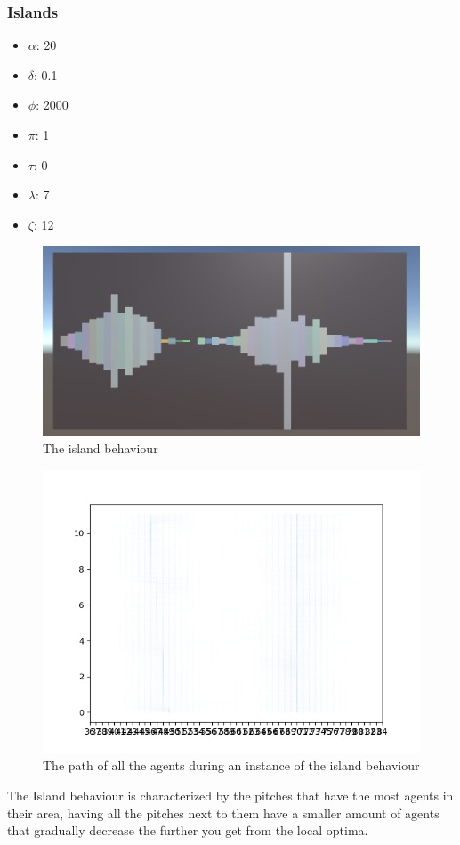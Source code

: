 \documentclass[a4paper,english]{report}
\begin{document}
	
	\subsubsection{Islands}
	\begin{samepage}\begin{itemize}
		\item $\alpha$: 20
		\item $\delta$: 0.1
		\item $\phi$: 2000
		\item $\pi$: 1
		\item $\tau$: 0
		\item $\lambda$: 7
		\item $\zeta$: 12
	\end{itemize}\end{samepage}
	\begin{figure}
		\centering
		\includegraphics[width=1\linewidth]{islands_vis}
		\caption{The island behaviour}
		\label{fig:islands}
	\end{figure}
	\begin{figure}
		\centering
		\includegraphics[width=1\linewidth]{islands}
		\caption{The path of all the agents during an instance of the island behaviour}
		\label{fig:islandsAll}
	\end{figure}
	The Island behaviour is characterized by the pitches that have the most agents in their area, having all the pitches next to them have a smaller amount of agents that gradually decrease the further you get from the local optima.
	
\end{document}
